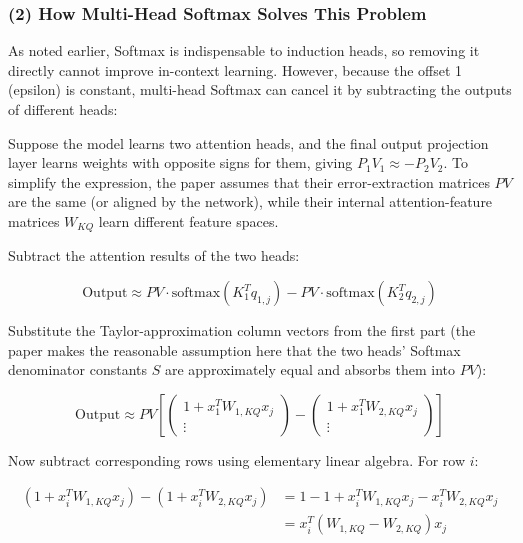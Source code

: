\hypertarget{how-multi-head-softmax-solves-this-problem}{%
\subsubsection{(2) How Multi-Head Softmax Solves This Problem}\label{how-multi-head-softmax-solves-this-problem}}

As noted earlier, Softmax is indispensable to induction heads, so removing it directly cannot improve in-context learning. However, because the offset 1 (epsilon) is constant, multi-head Softmax can cancel it by subtracting the outputs of different heads:

Suppose the model learns two attention heads, and the final output projection layer learns weights with opposite signs for them, giving \(P_1V_1 \approx -P_2V_2\). To simplify the expression, the paper assumes that their error-extraction matrices \(PV\) are the same (or aligned by the network), while their internal attention-feature matrices \(W_{KQ}\) learn different feature spaces.

Subtract the attention results of the two heads:

\[
\mathrm{Output} \approx PV \cdot \mathrm{softmax}(K_1^Tq_{1,j}) - PV \cdot \mathrm{softmax}(K_2^Tq_{2,j})
\]

Substitute the Taylor-approximation column vectors from the first part (the paper makes the reasonable assumption here that the two heads' Softmax denominator constants \(S\) are approximately equal and absorbs them into \(PV\)):

\[
\mathrm{Output} \approx PV \left[
\begin{pmatrix}
1+x_1^TW_{1,KQ}x_j \\
\vdots
\end{pmatrix} - \begin{pmatrix}
1+x_1^TW_{2,KQ}x_j \\
\vdots
\end{pmatrix}
\right]
\]

Now subtract corresponding rows using elementary linear algebra. For row \(i\):

\[
\begin{aligned}
(1+x_i^TW_{1,KQ}x_j)-(1+x_i^TW_{2,KQ}x_j)
&= 1-1+x_i^TW_{1,KQ}x_j-x_i^TW_{2,KQ}x_j \\
&= x_i^T(W_{1,KQ}-W_{2,KQ})x_j
\end{aligned}
\]

